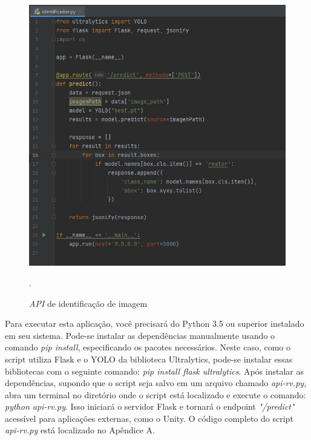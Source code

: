 \begin{figure}[!h]
    \centering
    \begin{minipage}{0.7\linewidth}
    \centering
    \captionsetup{justification=centering,margin=0.5cm,font=small}
    \includegraphics[width=1\linewidth]{img/cap5/API.jpeg}
    \caption{\textit{API} de identificação de imagem}.
    \label{fig:script-yolov8}
    \end{minipage}
\end{figure}

Para executar esta aplicação, você precisará do Python 3.5 ou superior instalado em seu sistema. Pode-se instalar as dependências manualmente usando o comando \textit{pip install}, especificando os pacotes necessários. Neste caso, como o script utiliza Flask e o YOLO da biblioteca Ultralytics, pode-se instalar essas bibliotecas com o seguinte comando: \textit{pip install flask ultralytics}. Após instalar as dependências, supondo que o script seja salvo em um arquivo chamado \textit{api-rv.py}, abra um terminal no diretório onde o script está localizado e execute o comando: \textit{python api-rv.py}. Isso iniciará o servidor Flask e tornará o endpoint \textit{"/predict"} acessível para aplicações externas, como o Unity. O código completo do script \textit{api-rv.py} está localizado no Apêndice A.


